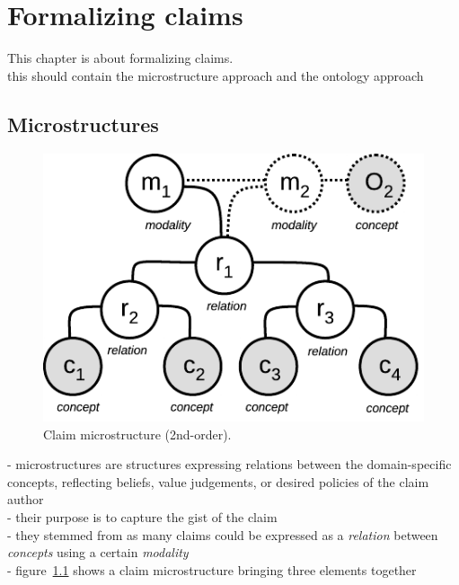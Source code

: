 \chapter{Formalizing claims}
\label{chap:formalization}

This chapter is about formalizing claims. \\
this should contain the microstructure approach and the ontology approach \\

\section{Microstructures}

\begin{figure}
	\begin{center}
      \includegraphics[scale=1]{microstructure.pdf}
      \end{center}
      \caption{Claim microstructure (2nd-order).}
  \label{fig:structures_flowchart}
\end{figure}

- microstructures are structures expressing relations between the domain-specific
concepts, reflecting beliefs, value judgements, or desired policies of the claim
author \\
- their purpose is to capture the gist of the claim \\
- they stemmed from as many claims could be expressed as a \emph{relation} between \emph{concepts} using 
a certain \emph{modality} \\
- figure~\ref{fig:structures_flowchart} shows a claim microstructure bringing three elements 
together \\

